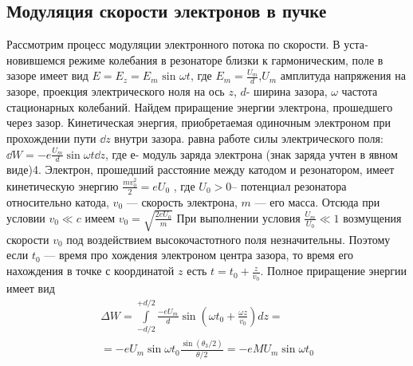 \subsection{Модуляция скорости электронов в пучке}
Рассмотрим процесс модуляции электронного потока по скорости. В уста­новившемся режиме колебания в резонаторе близки к гармоническим, поле
в зазоре имеет вид 
$E = E _ { z } = E _ { m } \text { sin } \omega t$, 
где $E _ { m } = \frac { U _ { m } } { d }$,$U _ { m }$ амплитуда напряжения на зазоре, проекция электрического ноля на ось $z$,
$d$- ширина зазора, $\omega$ частота стационарных колебаний. Найдем приращение энергии электрона, прошедшего через зазор. Кинетическая энергия,
приобретаемая одиночным электроном при прохождении пути $\dd z$ внутри за­зора. равна работе силы электрического поля: 
$\dd W = - e \frac { U _ { m } } { d } \sin \omega t \dd z$, где
$е$- модуль заряда электрона (знак заряда учтен в явном виде)4. Электрон,
прошедший расстояние между катодом и резонатором, имеет кинетическую
энергию 
$\frac { m v _ { 0 } ^ { 2 } } { 2 } = e U _ { 0 }$ , где $U_0 > 0$-- потенциал резонатора относительно ка­тода, $v_0$ — скорость электрона, $m$ — его масса. Отсюда при условии $v _ { 0 } \ll c$
имеем $v _ { 0 } = \sqrt { \frac { 2 e U _ { 0 } } { m } }$
При выполнении условия 
$\frac { U _ { m } } { U _ { 0 } } \ll 1$ возмущения скорости $v_0$ под воздействием высокочастотного поля незначительны. Поэтому если $t_0$ — время про­
хождения электроном центра зазора, то время его нахождения в точке с
координатой $z$ есть $t = t _ { 0 } + \frac { z } { v _ { 0 } }$. Полное приращение энергии имеет вид
\begin{gather*}
	 { \Delta W = \int\limits _ { - d / 2 }^{{ + d / 2 }} \frac { - e U _ { m } } { d } \sin \left( \omega t _ { 0 } + \frac { \omega z } { v _ { 0 } } \right) d z = } \\ 
	 { = - e U _ { m } \sin \omega t _ { 0 } \frac { \sin \left( \theta _ { 3 } / 2 \right) } { \theta / 2 } = - e M U _ { m } \sin \omega t _ { 0 } } 
\end{gather*}

